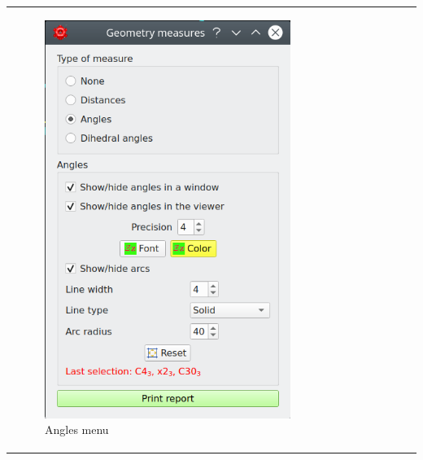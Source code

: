 \documentclass[10pt]{article}
\begin{document}
\hspace*{0mm}
\begin{tabular}{lcr}
\begin{minipage}{.2\linewidth}
\begin{figure}[H]
    \begin{center}
        \includegraphics[width=.8\linewidth]{damqt320_angles_1.png}
    \end{center}
    \vspace*{-1mm}
    \caption{Angles menu \label{fig:4_2_5}}
\end{figure}
\end{minipage}
&
\begin{minipage}{.45\linewidth}
    \vspace*{-4mm}
    \begin{figure}[H]
        \begin{center}
            \hspace*{0mm}

\end{center}
\end{figure}
\end{minipage}
\end{tabular}
\end{document}

